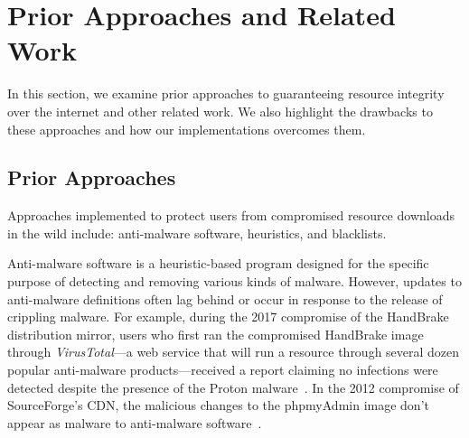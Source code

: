 \section{Prior Approaches and Related Work} \label{sec:related}


In this section, we examine prior approaches to guaranteeing resource integrity
over the internet and other related work. We also highlight the drawbacks to
these approaches and how our \SYSTEM{} implementations overcomes them.

\subsection{Prior Approaches}

Approaches implemented to protect users from compromised resource downloads in
the wild include: anti-malware software, heuristics, and blacklists.

Anti-malware software is a heuristic-based program designed for the specific
purpose of detecting and removing various kinds of malware. However, updates to
anti-malware definitions often lag behind or occur in response to the release of
crippling malware. For example, during the 2017 compromise of the HandBrake
distribution mirror, users who first ran the compromised HandBrake image through
\textit{VirusTotal}---a web service that will run a resource through several
dozen popular anti-malware products---received a report claiming no infections
were detected despite the presence of the Proton malware~\cite{SCA-HB1}. In the
2012 compromise of SourceForge's CDN, the malicious changes to the phpmyAdmin
image don't appear as malware to anti-malware software~\cite{SCA-PMA1}.

